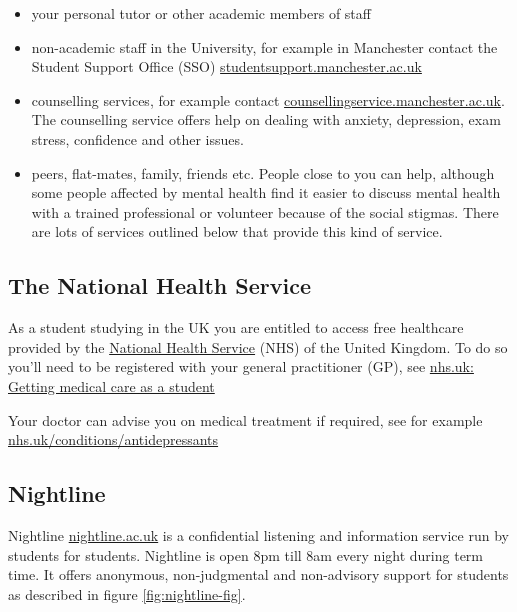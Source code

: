 \documentclass[
]{book}
\providecommand{\tightlist}{%
  \setlength{\itemsep}{0pt}\setlength{\parskip}{0pt}}
\begin{document}
\begin{itemize}
\tightlist
\item
  your personal tutor or other academic members of staff
\item
  non-academic staff in the University, for example in Manchester contact the Student Support Office (SSO) \href{https://www.studentsupport.manchester.ac.uk/}{studentsupport.manchester.ac.uk}
\item
  counselling services, for example contact \href{https://www.counsellingservice.manchester.ac.uk/}{counsellingservice.manchester.ac.uk}. The counselling service offers help on dealing with anxiety, depression, exam stress, confidence and other issues.
\item
  peers, flat-mates, family, friends etc. People close to you can help, although some people affected by mental health find it easier to discuss mental health with a trained professional or volunteer because of the social stigmas. There are lots of services outlined below that provide this kind of service.
\end{itemize}

\hypertarget{nhs}{%
\subsection{The National Health Service}\label{nhs}}

As a student studying in the UK you are entitled to access free healthcare provided by the \href{https://en.wikipedia.org/wiki/National_Health_Service}{National Health Service} (NHS) of the United Kingdom. To do so you'll need to be registered with your general practitioner (GP), see \href{https://www.nhs.uk/live-well/healthy-body/getting-medical-care-as-a-student/}{nhs.uk: Getting medical care as a student}

Your doctor can advise you on medical treatment if required, see for example \href{https://www.nhs.uk/conditions/antidepressants/}{nhs.uk/conditions/antidepressants}

\hypertarget{nightline}{%
\subsection{Nightline}\label{nightline}}

Nightline \href{https://www.nightline.ac.uk}{nightline.ac.uk} is a confidential listening and information service run by students for students. Nightline is open 8pm till 8am every night during term time. It offers anonymous, non-judgmental and non-advisory support for students as described in figure \ref{fig:nightline-fig}.
\end{document}
